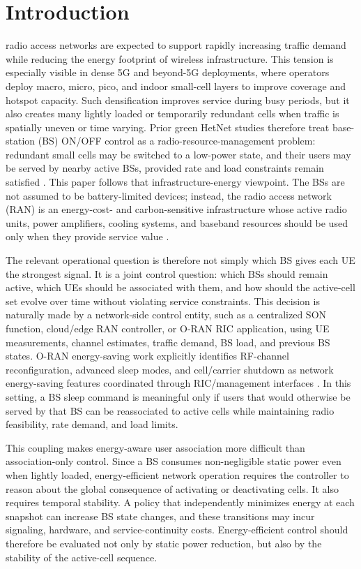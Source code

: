 \documentclass[journal]{IEEEtran}
\begin{document}
\section{Introduction}
 radio access networks are expected to support rapidly
increasing traffic demand while reducing the energy footprint of wireless
infrastructure. This tension is especially visible in dense 5G and beyond-5G
deployments, where operators deploy macro, micro, pico, and indoor small-cell
layers to improve coverage and hotspot capacity. Such densification improves
service during busy periods, but it also creates many lightly loaded or
temporarily redundant cells when traffic is spatially uneven or time varying.
Prior green HetNet studies therefore treat base-station (BS) ON/OFF control as
a radio-resource-management problem: redundant small cells may be switched to a
low-power state, and their users may be served by nearby active BSs, provided
rate and load constraints remain satisfied
\cite{ghazzai2017green,oh2013dynamic,feng2017onoff}. This paper follows that
infrastructure-energy viewpoint. The BSs are not assumed to be battery-limited
devices; instead, the radio access network (RAN) is an energy-cost- and
carbon-sensitive infrastructure whose active radio units, power amplifiers,
cooling systems, and baseband resources should be used only when they provide
service value \cite{oecd2025environmental,oran2025energy}.

The relevant operational question is therefore not simply which BS gives each
UE the strongest signal. It is a joint control question: which BSs should remain
active, which UEs should be associated with them, and how should the active-cell
set evolve over time without violating service constraints. This decision is
naturally made by a network-side control entity, such as a centralized SON
function, cloud/edge RAN controller, or O-RAN RIC application, using UE
measurements, channel estimates, traffic demand, BS load, and previous BS
states. O-RAN energy-saving work explicitly identifies RF-channel
reconfiguration, advanced sleep modes, and cell/carrier shutdown as network
energy-saving features coordinated through RIC/management interfaces
\cite{oran2025energy}. In this setting, a BS sleep command is meaningful only
if users that would otherwise be served by that BS can be reassociated to
active cells while maintaining radio feasibility, rate demand, and load limits.

This coupling makes energy-aware user association more difficult than
association-only control. Since a BS consumes non-negligible static power even
when lightly loaded, energy-efficient network operation requires the controller
to reason about the global consequence of activating or deactivating cells.
It also requires temporal stability. A policy that independently minimizes
energy at each snapshot can increase BS state changes, and these transitions may
incur signaling, hardware, and service-continuity costs. Energy-efficient
control should therefore be evaluated not only by static power reduction, but
also by the stability of the active-cell sequence.
\end{document}
